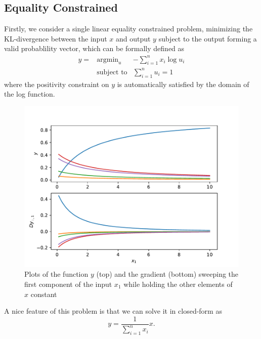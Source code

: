 \subsection{Equality Constrained}
Firstly, we consider a single linear equality constrained problem, minimizing the KL-divergence between the input $x$ and output $y$ subject to the output forming a valid probablility vector, which can be formally defined as 
\begin{equation}
    \begin{array}{rll}
        y =& \text{argmin}_u & - \sum_{i=1}^{n} x_i \log u_i \\
        & \text{subject to} & \sum_{i=1}^{n} u_i = 1
    \end{array}
\end{equation}
where the positivity constraint on $y$ is automatically satisfied by the domain of the log function.
\begin{figure}[t]
    \label{fig:equ-lin-eg}
    \centering
    \includegraphics[page=1,width=.8\textwidth]{figs/linear_equality_example.pdf} 
    \caption{Plots of the function $y$ (top) and the gradient (bottom) sweeping the first component of the input $x_1$ while holding the other elements of $x$ constant}
\end{figure}
\par A nice feature of this problem is that we can solve it in closed-form as
$$
y = \frac{1}{\sum_{i=1}^{n} x_i} x.
$$

